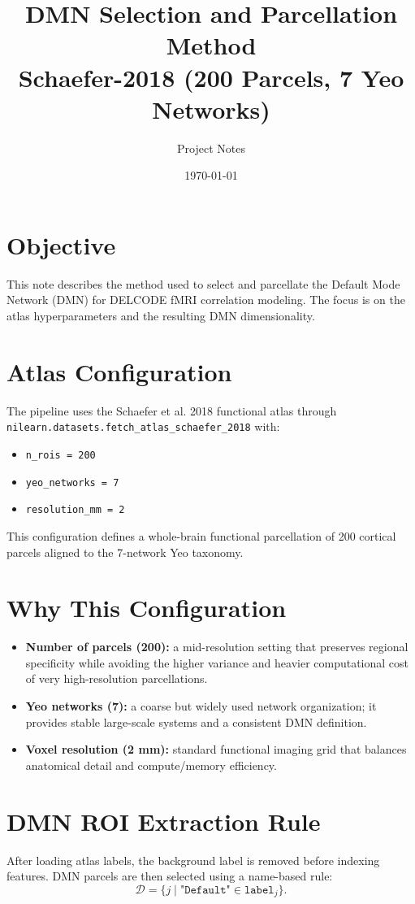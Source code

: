 \documentclass[11pt]{article}
\title{DMN Selection and Parcellation Method\\Schaefer-2018 (200 Parcels, 7 Yeo Networks)}
\author{Project Notes}
\date{\today}
\begin{document}
\maketitle

\section*{Objective}
This note describes the method used to select and parcellate the Default Mode Network (DMN) for DELCODE fMRI correlation modeling. The focus is on the atlas hyperparameters and the resulting DMN dimensionality.

\section*{Atlas Configuration}
The pipeline uses the Schaefer et al. 2018 functional atlas through \texttt{nilearn.datasets.fetch\_atlas\_schaefer\_2018} with:
\begin{itemize}
\item \texttt{n\_rois = 200}
\item \texttt{yeo\_networks = 7}
\item \texttt{resolution\_mm = 2}
\end{itemize}

This configuration defines a whole-brain functional parcellation of 200 cortical parcels aligned to the 7-network Yeo taxonomy.

\section*{Why This Configuration}
\begin{itemize}
\item \textbf{Number of parcels (200):} a mid-resolution setting that preserves regional specificity while avoiding the higher variance and heavier computational cost of very high-resolution parcellations.
\item \textbf{Yeo networks (7):} a coarse but widely used network organization; it provides stable large-scale systems and a consistent DMN definition.
\item \textbf{Voxel resolution (2 mm):} standard functional imaging grid that balances anatomical detail and compute/memory efficiency.
\end{itemize}

\section*{DMN ROI Extraction Rule}
After loading atlas labels, the background label is removed before indexing features. DMN parcels are then selected using a name-based rule:
\begin{equation}
\mathcal{D} = \{j \mid \texttt{"Default"} \in \texttt{label}_j\}.
\end{equation}
\end{document}
